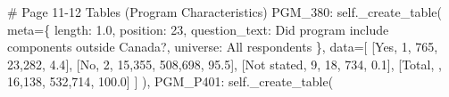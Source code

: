 \documentclass[
  11pt,
  a4paper,
]{article}
\newenvironment{Shaded}{\begin{snugshade}}{\end{snugshade}}
\newcommand{\CommentTok}[1]{\textcolor[rgb]{0.37,0.37,0.37}{#1}}
\newcommand{\NormalTok}[1]{\textcolor[rgb]{0.00,0.23,0.31}{#1}}
\newcommand{\OperatorTok}[1]{\textcolor[rgb]{0.37,0.37,0.37}{#1}}
\newcommand{\StringTok}[1]{\textcolor[rgb]{0.13,0.47,0.30}{#1}}
\newcommand{\VariableTok}[1]{\textcolor[rgb]{0.07,0.07,0.07}{#1}}
\begin{document}
\begin{Shaded}
\begin{Highlighting}[]
            \CommentTok{\# Page 11{-}12 Tables (Program Characteristics)}
            \StringTok{\textquotesingle{}PGM\_380\textquotesingle{}}\NormalTok{: }\VariableTok{self}\NormalTok{.\_create\_table(}
\NormalTok{                meta}\OperatorTok{=}\NormalTok{\{}
                    \StringTok{\textquotesingle{}length\textquotesingle{}}\NormalTok{: }\StringTok{\textquotesingle{}1.0\textquotesingle{}}\NormalTok{, }\StringTok{\textquotesingle{}position\textquotesingle{}}\NormalTok{: }\StringTok{\textquotesingle{}23\textquotesingle{}}\NormalTok{,}
                    \StringTok{\textquotesingle{}question\_text\textquotesingle{}}\NormalTok{: }\StringTok{\textquotesingle{}Did program include components outside Canada?\textquotesingle{}}\NormalTok{,}
                    \StringTok{\textquotesingle{}universe\textquotesingle{}}\NormalTok{: }\StringTok{\textquotesingle{}All respondents\textquotesingle{}}
\NormalTok{                \},}
\NormalTok{                data}\OperatorTok{=}\NormalTok{[}
\NormalTok{                    [}\StringTok{\textquotesingle{}Yes\textquotesingle{}}\NormalTok{, }\StringTok{\textquotesingle{}1\textquotesingle{}}\NormalTok{, }\StringTok{\textquotesingle{}765\textquotesingle{}}\NormalTok{, }\StringTok{\textquotesingle{}23,282\textquotesingle{}}\NormalTok{, }\StringTok{\textquotesingle{}4.4\textquotesingle{}}\NormalTok{],}
\NormalTok{                    [}\StringTok{\textquotesingle{}No\textquotesingle{}}\NormalTok{, }\StringTok{\textquotesingle{}2\textquotesingle{}}\NormalTok{, }\StringTok{\textquotesingle{}15,355\textquotesingle{}}\NormalTok{, }\StringTok{\textquotesingle{}508,698\textquotesingle{}}\NormalTok{, }\StringTok{\textquotesingle{}95.5\textquotesingle{}}\NormalTok{],}
\NormalTok{                    [}\StringTok{\textquotesingle{}Not stated\textquotesingle{}}\NormalTok{, }\StringTok{\textquotesingle{}9\textquotesingle{}}\NormalTok{, }\StringTok{\textquotesingle{}18\textquotesingle{}}\NormalTok{, }\StringTok{\textquotesingle{}734\textquotesingle{}}\NormalTok{, }\StringTok{\textquotesingle{}0.1\textquotesingle{}}\NormalTok{],}
\NormalTok{                    [}\StringTok{\textquotesingle{}Total\textquotesingle{}}\NormalTok{, }\StringTok{\textquotesingle{}\textquotesingle{}}\NormalTok{, }\StringTok{\textquotesingle{}16,138\textquotesingle{}}\NormalTok{, }\StringTok{\textquotesingle{}532,714\textquotesingle{}}\NormalTok{, }\StringTok{\textquotesingle{}100.0\textquotesingle{}}\NormalTok{]}
\NormalTok{                ]}
\NormalTok{            ),}
            \StringTok{\textquotesingle{}PGM\_P401\textquotesingle{}}\NormalTok{: }\VariableTok{self}\NormalTok{.\_create\_table(}

\end{Highlighting}
\end{Shaded}
\end{document}
